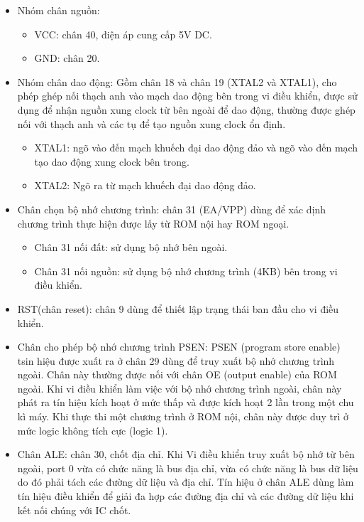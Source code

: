 \documentclass[../report.tex]{subfiles}
\begin{document}
\begin{itemize}
\item Nhóm chân nguồn: 
\begin{itemize}
\item VCC: chân 40, điện áp cung cấp 5V DC.
\item GND: chân 20.
\end{itemize}

\item Nhóm chân dao động: Gồm chân 18 và chân 19 (XTAL2 và XTAL1), cho phép 
ghép nối thạch anh vào mạch dao động bên trong vi điều khiển, được sử dụng để nhận nguồn xung 
clock từ bên ngoài để dao động, thường được ghép nối với thạch anh và các tụ để tạo nguồn xung clock ổn định. 
\begin{itemize}
\item XTAL1: ngõ vào đến mạch khuếch đại dao động đảo và ngõ vào đến mạch tạo dao động xung clock bên trong. 
\item XTAL2: Ngõ ra từ mạch khuếch đại dao động đảo. 
\end{itemize}

\item Chân chọn bộ nhớ chương trình: chân 31 (EA/VPP) dùng để xác định chương trình thực hiện 
được lấy từ ROM nội hay ROM ngoại. 
\begin{itemize}
\item Chân 31 nối đất: sử dụng bộ nhớ bên ngoài. 
\item Chân 31 nối nguồn: sử dụng bộ nhớ chương trình (4KB) bên trong vi điều khiển. 
\end{itemize}

\item RST(chân reset): chân 9 dùng để thiết lập trạng thái ban đầu cho vi điều khiển. 
\item Chân cho phép bộ nhớ chương trình PSEN: PSEN (program store enable) tsin hiệu được xuất 
ra ở chân 29 dùng để truy xuất bộ nhớ chương trình ngoài. Chân này thường được nối với chân OE 
(output enable) của ROM ngoài. 
Khi vi điều khiển làm việc với bộ nhớ chương trình ngoài, 
chân này phát ra tín hiệu kích hoạt ở mức thấp và được kích hoạt 2 lần trong một chu kì máy.
Khi thực thi một chương trình ở ROM nội, 
chân này được duy trì ở mức logic không tích cực (logic 1).

\item Chân ALE: chân 30, chốt địa chỉ. 
Khi Vi điều khiển truy xuất bộ nhớ từ bên ngoài, 
port 0 vừa có chức năng là bus địa chỉ, 
vừa có chức năng là bus dữ liệu do đó phải tách các đường dữ liệu và địa chỉ. 
Tín hiệu ở chân ALE dùng làm tín hiệu điều khiển để giải đa hợp các đường địa chỉ 
và các đường dữ liệu khi kết nối chúng với IC chốt.


\end{itemize}
\end{document}
